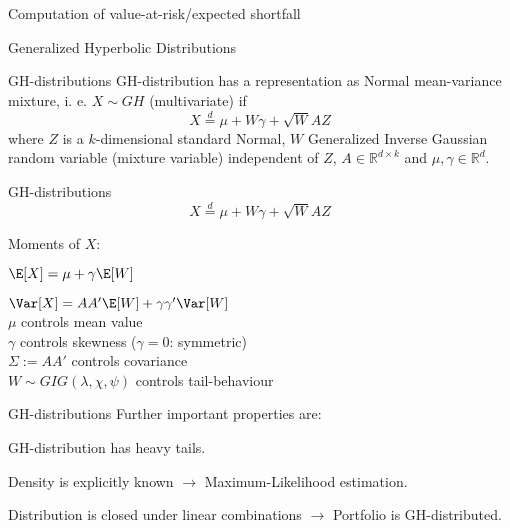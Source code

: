 	Computation of value-at-risk/expected shortfall






{Generalized Hyperbolic Distributions}

{GH-distributions} GH-distribution has a
representation as Normal mean-variance mixture, i. e. $X\sim GH$
(multivariate) if
$$X\stackrel{d}{=}\mu+W\gamma+\sqrt{W}AZ$$
where $Z$ is a $k$-dimensional standard Normal, $W$ Generalized
Inverse Gaussian random variable (mixture variable) independent of
$Z$, $A\in\mathbb{R}^{d\times k}$ and $\mu, \gamma \in
\mathbb{R}^d$.

{GH-distributions} %
$$X\stackrel{d}{=}\mu+W\gamma+\sqrt{W}AZ$$






	Moments of $X$:

	$\E[X]=\mu+\gamma\E[W]$

	$\Var[X]=AA'\E[W]+\gamma\gamma'\Var[W]$\\[-1.5cm]

	$\mu$ controls mean value\\[-1.5cm]

	$\gamma$ controls skewness ($\gamma=0$: symmetric)\\[-1.5cm]

	$\Sigma:=AA'$ controls covariance\\[-1.5cm]

	$W\sim GIG(\lambda,\chi,\psi)$ controls tail-behaviour






{GH-distributions} %
Further important properties
are: %






	GH-distribution has heavy tails.

	Density is explicitly
known $\rightarrow$ Maximum-Likelihood estimation.

Distribution is closed under linear combinations $\rightarrow$
Portfolio is GH-distributed.

